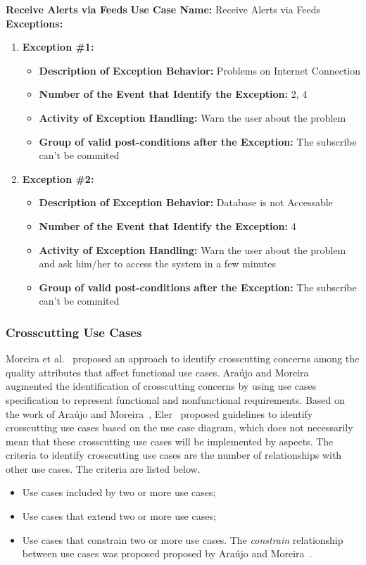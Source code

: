 \documentclass[11pt,twoside]{article}
\begin{document}
\textbf{Receive Alerts via Feeds}
\textbf{Use Case Name:} Receive Alerts via Feeds\\
\textbf{Exceptions:}
\begin{enumerate}
 \item \textbf{Exception \#1:}
 \begin{itemize}
  \item \textbf{Description of Exception Behavior:} Problems on Internet Connection
  \item \textbf{Number of the Event that Identify the Exception:} 2, 4
  \item \textbf{Activity of Exception Handling:} Warn the user about the problem
  \item \textbf{Group of valid post-conditions after the Exception:} The subscribe can't be commited
 \end{itemize}
 \item \textbf{Exception \#2:}
 \begin{itemize}
  \item \textbf{Description of Exception Behavior:} Database is not Accessable
  \item \textbf{Number of the Event that Identify the Exception:} 4
  \item \textbf{Activity of Exception Handling:} Warn the user about the problem and ask him/her to access the system in a few minutes
  \item \textbf{Group of valid post-conditions after the Exception:} The subscribe can't be commited
 \end{itemize}
\end{enumerate}

\subsubsection{Crosscutting Use Cases}
\label{sec:xUseCases}
Moreira et al.~\cite{Moreira:2002:CQA} proposed an approach to identify crosscutting concerns among the quality attributes that
affect functional use cases. Ara\'{u}jo and Moreira~\cite{Araujo:2003:AUC} augmented the identification of crosscutting concerns by using
use cases specification to represent functional and nonfunctional requirements. Based on the work of Ara\'{u}jo and
Moreira~\cite{Araujo:2003:AUC}, Eler~\cite[Chapter 4.4.10]{Eler:2006:MDS} proposed guidelines to identify crosscutting use cases based on
the use case diagram, which does not necessarily mean that these crosscutting use cases will be implemented by aspects. The criteria to
identify crosscutting use cases are the number of relationships with other use cases. The criteria are listed below.
\begin{itemize}
\item Use cases included by two or more use cases;
\item Use cases that extend two or more use cases;
\item Use cases that constrain two or more use cases. The \textit{constrain} relationship between use cases was proposed 
proposed by Ara\'{u}jo and Moreira~\cite{Araujo:2003:AUC}. 
\end{itemize}
\end{document}
